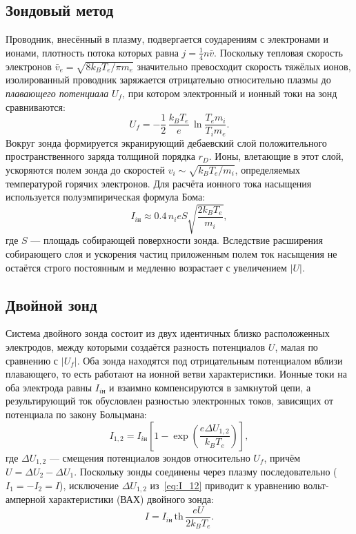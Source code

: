 \documentclass[reprint, amsmath, amssymb, aps, pra, nofootinbib]{revtex4-2}
\begin{document}
\subsection{Зондовый метод}
Проводник, внесённый в плазму, подвергается соударениям с электронами и ионами, плотность потока которых равна $j = \frac{1}{4}n\bar{v}$. Поскольку тепловая скорость электронов $\bar{v}_e = \sqrt{8k_B T_e/\pi m_e}$ значительно превосходит скорость тяжёлых ионов, изолированный проводник заряжается отрицательно относительно плазмы до \textit{плавающего потенциала} $U_f$, при котором электронный и ионный токи на зонд сравниваются:
\begin{equation}
U_f = -\frac{1}{2}\,\frac{k_B T_e}{e}\,\ln\frac{T_e m_i}{T_i m_e}. \label{eq:U_f}
\end{equation}
Вокруг зонда формируется экранирующий дебаевский слой положительного пространственного заряда толщиной порядка $r_D$. Ионы, влетающие в этот слой, ускоряются полем зонда до скоростей $v_i \sim \sqrt{k_B T_e/m_i}$, определяемых температурой горячих электронов. Для расчёта ионного тока насыщения используется полуэмпирическая формула Бома:
\begin{equation}
I_{i\text{н}} \approx 0.4\, n_i e S \sqrt{\frac{2k_B T_e}{m_i}}, \label{eq:Bohm}
\end{equation}
где $S$ --- площадь собирающей поверхности зонда. Вследствие расширения собирающего слоя и ускорения частиц приложенным полем ток насыщения не остаётся строго постоянным и медленно возрастает с увеличением $|U|$.

\subsection{Двойной зонд}
Система двойного зонда состоит из двух идентичных близко расположенных электродов, между которыми создаётся разность потенциалов $U$, малая по сравнению с $|U_f|$. Оба зонда находятся под отрицательным потенциалом вблизи плавающего, то есть работают на ионной ветви характеристики. Ионные токи на оба электрода равны $I_{i\text{н}}$ и взаимно компенсируются в замкнутой цепи, а результирующий ток обусловлен разностью электронных токов, зависящих от потенциала по закону Больцмана:
\begin{equation}
I_{1,2} = I_{i\text{н}}\left[1 - \exp\left(\frac{e\Delta U_{1,2}}{k_B T_e}\right)\right], \label{eq:I_12}
\end{equation}
где $\Delta U_{1,2}$ --- смещения потенциалов зондов относительно $U_f$, причём $U = \Delta U_2 - \Delta U_1$. Поскольку зонды соединены через плазму последовательно ($I_1 = -I_2 = I$), исключение $\Delta U_{1,2}$ из~\eqref{eq:I_12} приводит к уравнению вольт-амперной характеристики (ВАХ) двойного зонда:
\begin{equation}
I = I_{i\text{н}}\,\mathrm{th}\,\frac{eU}{2k_B T_e}. \label{eq:double_probe}
\end{equation}
\end{document}
